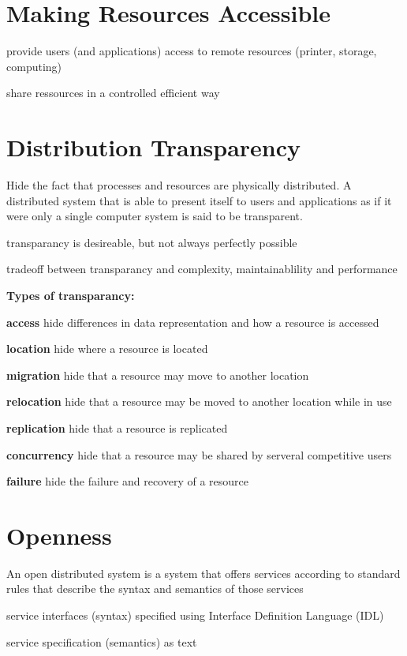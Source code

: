 \documentclass[ngerman,a4paper]{report}
\begin{document}
\section{Making Resources Accessible}

\begin{compactitem}
\item provide users (and applications) access to remote resources (printer, storage, computing)
\item share ressources in a controlled efficient way
\end{compactitem}

\section{Distribution Transparency}
Hide the fact that processes and resources are physically distributed. A distributed system that is able to present itself to users and applications as if it were only a single computer system is said to be transparent.
\begin{compactitem}
\item transparancy is desireable, but not always perfectly possible
\item tradeoff between transparancy and complexity, maintainablility and performance
\end{compactitem}

\pagebreak
\textbf{Types of transparancy:}
\begin{compactitem}
\item[\textbf{access}] hide differences in data representation and how a resource is accessed
\item[\textbf{location}] hide where a resource is located
\item[\textbf{migration}] hide that a resource may move to another location
\item[\textbf{relocation}] hide that a resource may be moved to another location while in use
\item[\textbf{replication}] hide that a resource is replicated
\item[\textbf{concurrency}] hide that a resource may be shared by serveral competitive users
\item[\textbf{failure}] hide the failure and recovery of a resource
\end{compactitem}

\section{Openness}
\begin{compactitem}
\item An open distributed system is a system that offers services according to standard rules that describe the syntax and semantics of those services
\item service interfaces (syntax) specified using Interface Definition Language (IDL)
\item service specification (semantics) as text
\end{compactitem}
\end{document}
